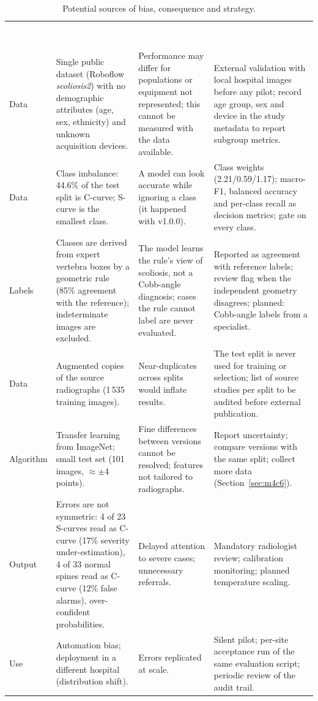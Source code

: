 \documentclass[12pt,a4paper]{article}
\newcommand{\hd}[1]{\textcolor{white}{\textbf{#1}}}
\begin{document}
\begin{table}[H]
\centering
\caption{Potential sources of bias, consequence and strategy.}
\label{tab:bias}
\renewcommand{\arraystretch}{1.25}
\begin{tabularx}{\textwidth}{L{2.2cm} Y Y Y}
\hd{Level} & \hd{Source} & \hd{Possible consequence} & \hd{Strategy} \\
Data & Single public dataset (Roboflow \emph{scoliosis2}) with no demographic attributes (age, sex, ethnicity) and unknown acquisition devices. & Performance may differ for populations or equipment not represented; this cannot be measured with the data available. & External validation with local hospital images before any pilot; record age group, sex and device in the study metadata to report subgroup metrics. \\
Data & Class imbalance: 44.6\% of the test split is C-curve; S-curve is the smallest class. & A model can look accurate while ignoring a class (it happened with v1.0.0). & Class weights (2.21/0.59/1.17); macro-F1, balanced accuracy and per-class recall as decision metrics; gate on every class. \\
Labels & Classes are derived from expert vertebra boxes by a geometric rule (85\% agreement with the reference); indeterminate images are excluded. & The model learns the rule's view of scoliosis, not a Cobb-angle diagnosis; cases the rule cannot label are never evaluated. & Reported as agreement with reference labels; review flag when the independent geometry disagrees; planned: Cobb-angle labels from a specialist. \\
Data & Augmented copies of the source radiographs (1\,535 training images). & Near-duplicates across splits would inflate results. & The test split is never used for training or selection; list of source studies per split to be audited before external publication. \\
Algorithm & Transfer learning from ImageNet; small test set (101 images, $\approx\pm$4 points). & Fine differences between versions cannot be resolved; features not tailored to radiographs. & Report uncertainty; compare versions with the same split; collect more data (Section~\ref{sec:m4c6}). \\
Output & Errors are not symmetric: 4 of 23 S-curves read as C-curve (17\% severity under-estimation), 4 of 33 normal spines read as C-curve (12\% false alarms), over-confident probabilities. & Delayed attention to severe cases; unnecessary referrals. & Mandatory radiologist review; calibration monitoring; planned temperature scaling. \\
Use & Automation bias; deployment in a different hospital (distribution shift). & Errors replicated at scale. & Silent pilot; per-site acceptance run of the same evaluation script; periodic review of the audit trail. \\
\end{tabularx}
\end{table}
\end{document}
